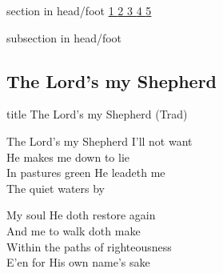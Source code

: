 \documentclass[aspectratio=169]{beamer}
\begin{document}
{
{ 
 {
 \begin{beamercolorbox}[ht=4.5ex,dp=1.5ex,%
      leftskip=.3cm,rightskip=.3cm plus1fil]{section in head/foot}
 \fontsize{12}{25}\selectfont 
\hyperlink{The Lord's my Shepherd['Psalm 23'](Trad)1}{1  }\hyperlink{The Lord's my Shepherd['Psalm 23'](Trad)2}{2  }\hyperlink{The Lord's my Shepherd['Psalm 23'](Trad)3}{3  }\hyperlink{The Lord's my Shepherd['Psalm 23'](Trad)4}{4  }\hyperlink{The Lord's my Shepherd['Psalm 23'](Trad)5}{5  } 
 \end{beamercolorbox}%
  \begin{beamercolorbox}[ht=2.5ex,dp=1.125ex,%
   leftskip=.3cm,rightskip=.3cm plus1fil]{subsection in head/foot}
   \insertauthor
 \end{beamercolorbox}%
 }
}
\subsection{The Lord's my Shepherd}
\hypertarget{The Lord's my Shepherd['Psalm 23'](Trad)}{}
\begin{frame}{}
 \vfill
  \centering
  \begin{beamercolorbox}[sep=8pt,center,shadow=true,rounded=true]{title}
    The Lord's my Shepherd (Trad)    
  \end{beamercolorbox}
  \vfill
\end{frame}

\hypertarget{The Lord's my Shepherd['Psalm 23'](Trad)1}{}
\begin{frame}{}
\fontsize{23.68421052631579}{28.42105263157895}\selectfont

The Lord's my Shepherd I'll not want\\ 
He makes me down to lie\\ 
In pastures green He leadeth me\\ 
The quiet waters by

\end{frame}
\hypertarget{The Lord's my Shepherd['Psalm 23'](Trad)2}{}
\begin{frame}{}
\fontsize{23.68421052631579}{28.42105263157895}\selectfont

My soul He doth restore again\\ 
And me to walk doth make\\ 
Within the paths of righteousness\\ 
E'en for His own name's sake


\end{frame}}
\end{document}
